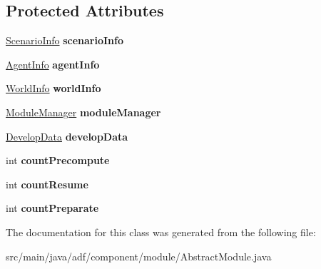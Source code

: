 \subsection*{Protected Attributes}
\begin{DoxyCompactItemize}
\item 
\hypertarget{classadf_1_1component_1_1module_1_1AbstractModule_a4f3c28aad990c2d969f06f0cd7955281}{}\label{classadf_1_1component_1_1module_1_1AbstractModule_a4f3c28aad990c2d969f06f0cd7955281} 
\hyperlink{classadf_1_1agent_1_1info_1_1ScenarioInfo}{Scenario\+Info} {\bfseries scenario\+Info}
\item 
\hypertarget{classadf_1_1component_1_1module_1_1AbstractModule_a7899d34c90df44723cdcb35653735a54}{}\label{classadf_1_1component_1_1module_1_1AbstractModule_a7899d34c90df44723cdcb35653735a54} 
\hyperlink{classadf_1_1agent_1_1info_1_1AgentInfo}{Agent\+Info} {\bfseries agent\+Info}
\item 
\hypertarget{classadf_1_1component_1_1module_1_1AbstractModule_a55634f32bad39f01c25258278fbc37aa}{}\label{classadf_1_1component_1_1module_1_1AbstractModule_a55634f32bad39f01c25258278fbc37aa} 
\hyperlink{classadf_1_1agent_1_1info_1_1WorldInfo}{World\+Info} {\bfseries world\+Info}
\item 
\hypertarget{classadf_1_1component_1_1module_1_1AbstractModule_a4e44edcd327e67f929c357b77b127f89}{}\label{classadf_1_1component_1_1module_1_1AbstractModule_a4e44edcd327e67f929c357b77b127f89} 
\hyperlink{classadf_1_1agent_1_1module_1_1ModuleManager}{Module\+Manager} {\bfseries module\+Manager}
\item 
\hypertarget{classadf_1_1component_1_1module_1_1AbstractModule_aa7337d08e34428dfc5baa9582c3d4444}{}\label{classadf_1_1component_1_1module_1_1AbstractModule_aa7337d08e34428dfc5baa9582c3d4444} 
\hyperlink{classadf_1_1agent_1_1develop_1_1DevelopData}{Develop\+Data} {\bfseries develop\+Data}
\item 
\hypertarget{classadf_1_1component_1_1module_1_1AbstractModule_ac27522e5285817688c6bf7d9d23aec08}{}\label{classadf_1_1component_1_1module_1_1AbstractModule_ac27522e5285817688c6bf7d9d23aec08} 
int {\bfseries count\+Precompute}
\item 
\hypertarget{classadf_1_1component_1_1module_1_1AbstractModule_a7c11281a28a021a7a02349ca0c870ecf}{}\label{classadf_1_1component_1_1module_1_1AbstractModule_a7c11281a28a021a7a02349ca0c870ecf} 
int {\bfseries count\+Resume}
\item 
\hypertarget{classadf_1_1component_1_1module_1_1AbstractModule_a2b9f46eb6fcf94d9ef69d39365559b02}{}\label{classadf_1_1component_1_1module_1_1AbstractModule_a2b9f46eb6fcf94d9ef69d39365559b02} 
int {\bfseries count\+Preparate}
\end{DoxyCompactItemize}


The documentation for this class was generated from the following file\+:\begin{DoxyCompactItemize}
\item 
src/main/java/adf/component/module/Abstract\+Module.\+java\end{DoxyCompactItemize}
